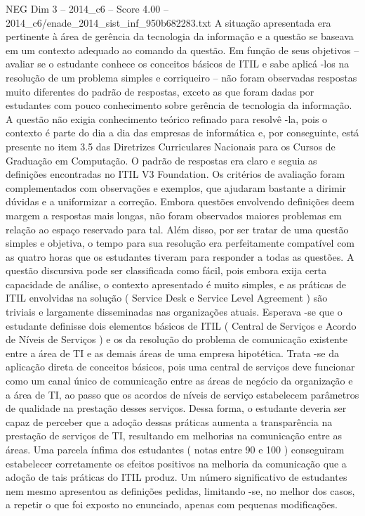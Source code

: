 \begin{textsample}{NEG Dim 3 – 2014\_c6 – Score 4.00 – 2014\_c6/enade\_2014\_sist\_inf\_950b682283.txt}
A situação apresentada era pertinente à área de gerência da tecnologia da informação e a questão se baseava em um contexto adequado ao comando da questão.
Em função de seus objetivos – avaliar se o estudante conhece os conceitos básicos de ITIL e sabe aplicá -los na resolução de um problema simples e corriqueiro – não foram observadas respostas muito diferentes do padrão de respostas, exceto as que foram dadas por estudantes com pouco conhecimento sobre gerência de tecnologia da informação.
A questão não exigia conhecimento teórico refinado para resolvê -la, pois o contexto é parte do dia a dia das empresas de informática e, por conseguinte, está presente no item 3.5 das Diretrizes Curriculares Nacionais para os Cursos de Graduação em Computação.
O padrão de respostas era claro e seguia as definições encontradas no ITIL V3 Foundation.
Os critérios de avaliação foram complementados com observações e exemplos, que ajudaram bastante a dirimir dúvidas e a uniformizar a correção.
Embora questões envolvendo definições deem margem a respostas mais longas, não foram observados maiores problemas em relação ao espaço reservado para tal.
Além disso, por ser tratar de uma questão simples e objetiva, o tempo para sua resolução era perfeitamente compatível com as quatro horas que os estudantes tiveram para responder a todas as questões.
A questão discursiva pode ser classificada como fácil, pois embora exija certa capacidade de análise, o contexto apresentado é muito simples, e as práticas de ITIL envolvidas na solução ( Service Desk e Service Level Agreement ) são triviais e largamente disseminadas nas organizações atuais.
Esperava -se que o estudante definisse dois elementos básicos de ITIL ( Central de Serviços e Acordo de Níveis de Serviços ) e os da resolução do problema de comunicação existente entre a área de TI e as demais áreas de uma empresa hipotética.
Trata -se da aplicação direta de conceitos básicos, pois uma central de serviços deve funcionar como um canal único de comunicação entre as áreas de negócio da organização e a área de TI, ao passo que os acordos de níveis de serviço estabelecem parâmetros de qualidade na prestação desses serviços.
Dessa forma, o estudante deveria ser capaz de perceber que a adoção dessas práticas aumenta a transparência na prestação de serviços de TI, resultando em melhorias na comunicação entre as áreas.
Uma parcela ínfima dos estudantes ( notas entre 90 e 100 ) conseguiram estabelecer corretamente os efeitos positivos na melhoria da comunicação que a adoção de tais práticas do ITIL produz.
Um número significativo de estudantes nem mesmo apresentou as definições pedidas, limitando -se, no melhor dos casos, a repetir o que foi exposto no enunciado, apenas com pequenas modificações.

\end{textsample}
